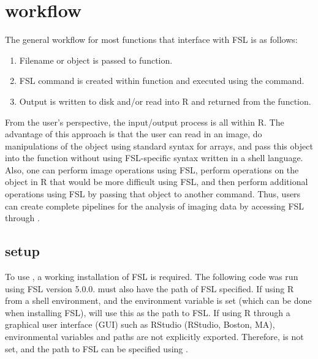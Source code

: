 
\section{ workflow}
The general workflow for most  functions that interface with FSL is as follows:
\begin{enumerate}
\item Filename or  object is passed to  function.
\item FSL command is created within  function and executed using the  command.
\item Output is written to disk and/or read into R and returned from the function.
\end{enumerate}

From the user's perspective, the input/output process is all within R.  The advantage of this approach is that the user can read in an image, do manipulations of the  object using standard syntax for arrays, and pass this object into the  function without using FSL-specific syntax written in a shell language.  Also, one can perform image operations using FSL, perform operations on the  object in R that would be more difficult using FSL, and then perform additional operations using FSL by passing that object to another  command.  Thus, users can create complete pipelines for the analysis of imaging data by accessing FSL through . 

\subsection{ setup}
To use , a working installation of FSL is required.  The following code was run using FSL version 5.0.0.  must also have the path of FSL specified.  If using R from a shell environment, and the  environment variable is set (which can be done when installing FSL),  will use this as the path to FSL.  If using R through a graphical user interface (GUI) such as RStudio (RStudio, Boston, MA), environmental variables and paths are not explicitly exported.  Therefore,  is not set, and the path to FSL can be specified using . 

